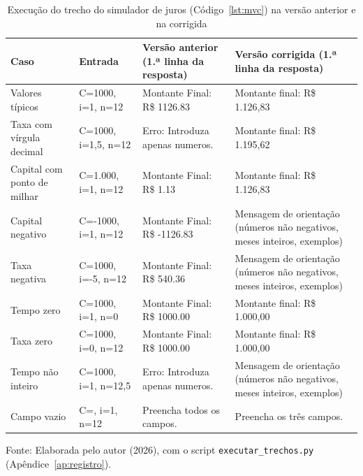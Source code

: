 \begin{table}[htb]
\centering
\caption{Execução do trecho do simulador de juros (Código~\ref{lst:mvc}) na versão anterior e na corrigida}
\label{tab:execucao-juros}
\footnotesize
\begin{tabular}{L{2.7cm} L{3.4cm} L{4.0cm} L{4.0cm}}
\hline
Caso & Entrada & Versão anterior (1.ª linha da resposta) & Versão corrigida (1.ª linha da resposta) \\ \hline
Valores típicos & C=\textquotesingle{}1000\textquotesingle{}, i=\textquotesingle{}1\textquotesingle{}, n=\textquotesingle{}12\textquotesingle{} & Montante Final: R\$ 1126.83 & Montante final: R\$ 1.126,83 \\ \hline
Taxa com vírgula decimal & C=\textquotesingle{}1000\textquotesingle{}, i=\textquotesingle{}1,5\textquotesingle{}, n=\textquotesingle{}12\textquotesingle{} & Erro: Introduza apenas numeros. & Montante final: R\$ 1.195,62 \\ \hline
Capital com ponto de milhar & C=\textquotesingle{}1.000\textquotesingle{}, i=\textquotesingle{}1\textquotesingle{}, n=\textquotesingle{}12\textquotesingle{} & Montante Final: R\$ 1.13 & Montante final: R\$ 1.126,83 \\ \hline
Capital negativo & C=\textquotesingle{}-1000\textquotesingle{}, i=\textquotesingle{}1\textquotesingle{}, n=\textquotesingle{}12\textquotesingle{} & Montante Final: R\$ -1126.83 & Mensagem de orientação (números não negativos, meses inteiros, exemplos) \\ \hline
Taxa negativa & C=\textquotesingle{}1000\textquotesingle{}, i=\textquotesingle{}-5\textquotesingle{}, n=\textquotesingle{}12\textquotesingle{} & Montante Final: R\$ 540.36 & Mensagem de orientação (números não negativos, meses inteiros, exemplos) \\ \hline
Tempo zero & C=\textquotesingle{}1000\textquotesingle{}, i=\textquotesingle{}1\textquotesingle{}, n=\textquotesingle{}0\textquotesingle{} & Montante Final: R\$ 1000.00 & Montante final: R\$ 1.000,00 \\ \hline
Taxa zero & C=\textquotesingle{}1000\textquotesingle{}, i=\textquotesingle{}0\textquotesingle{}, n=\textquotesingle{}12\textquotesingle{} & Montante Final: R\$ 1000.00 & Montante final: R\$ 1.000,00 \\ \hline
Tempo não inteiro & C=\textquotesingle{}1000\textquotesingle{}, i=\textquotesingle{}1\textquotesingle{}, n=\textquotesingle{}12,5\textquotesingle{} & Erro: Introduza apenas numeros. & Mensagem de orientação (números não negativos, meses inteiros, exemplos) \\ \hline
Campo vazio & C=\textquotesingle{}\textquotesingle{}, i=\textquotesingle{}1\textquotesingle{}, n=\textquotesingle{}12\textquotesingle{} & Preencha todos os campos. & Preencha os três campos. \\ \hline
\end{tabular}
\par\vspace{0.1cm}
{\small Fonte: Elaborada pelo autor (2026), com o script \texttt{executar\_trechos.py} (Apêndice~\ref{ap:registro}).}
\end{table}

